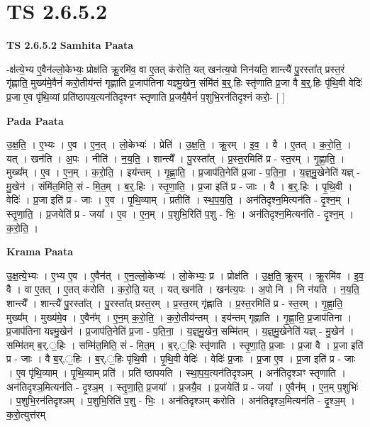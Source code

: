 \documentclass[17pt]{extarticle}
\begin{document}
\section*{ TS 2.6.5.2 }

\textbf{TS 2.6.5.2 } \newline
\textbf{Samhita Paata} \newline

-क्ष॑त्ये॒भ्य ए॒वैन॑ल्लो॒केभ्यः॒ प्रोक्ष॑ति क्रू॒रमि॑व॒ वा ए॒तत् क॑रोति॒ यत् खन॑त्य॒पो निन॑यति॒ शान्त्यै॑ पु॒रस्ता᳚त् प्रस्त॒रं गृ॑ह्णाति॒ मुख्य॑मे॒वैनं॑ करो॒तीय॑न्तं गृह्णाति प्र॒जाप॑तिना यज्ञ्मु॒खेन॒ संमि॑तं ब॒र्॒.हिः स्तृ॑णाति प्र॒जा वै ब॒र्॒.हिः पृ॑थि॒वी वेदिः॑ प्र॒जा ए॒व पृ॑थि॒व्यां प्रति॑ष्ठापय॒त्यन॑तिदृश्नꣳ स्तृणाति प्र॒जयै॒वैनं॑ प॒शुभि॒रन॑तिदृश्नं करो॒- [  ] \newline

\textbf{Pada Paata} \newline

उ॒क्ष॒ति॒ । ए॒भ्यः । ए॒व । ए॒न॒त् । लो॒केभ्यः॑ । प्रेति॑ । उ॒क्ष॒ति॒ । क्रू॒रम् । इ॒व॒ । वै । ए॒तत् । क॒रो॒ति॒ । यत् । खन॑ति । अ॒पः । नीति॑ । न॒य॒ति॒ । शान्त्यै᳚ । पु॒रस्ता᳚त् । प्र॒स्त॒रमिति॑ प्र - स्त॒रम् । गृ॒ह्णा॒ति॒ । मुख्य᳚म् । ए॒व । ए॒न॒म् । क॒रो॒ति॒ । इय॑न्तम् । गृ॒ह्णा॒ति॒ । प्र॒जाप॑ति॒नेति॑ प्र॒जा - प॒ति॒ना॒ । य॒ज्ञ्॒मु॒खेनेति॑ यज्ञ् - मु॒खेन॑ । संमि॑त॒मिति॒ सं - मि॒त॒म् । ब॒र्॒.हिः । स्तृ॒णा॒ति॒ । प्र॒जा इति॑ प्र - जाः । वै । ब॒र्॒.हिः । पृ॒थि॒वी । वेदिः॑ । प्र॒जा इति॑ प्र - जाः । ए॒व । पृ॒थि॒व्याम् । प्रतीति॑ । स्थ॒प॒य॒ति॒ । अन॑तिदृश्न॒मित्यन॑ति - दृ॒श्न॒म् । स्तृ॒णा॒ति॒ । प्र॒जयेति॑ प्र - जया᳚ । ए॒व । ए॒न॒म् । प॒शुभि॒रिति॑ प॒शु - भिः॒ । अन॑तिदृश्न॒मित्यन॑ति - दृ॒श्न॒म् । क॒रो॒ति॒ ।  \newline


\textbf{Krama Paata} \newline

उ॒क्ष॒त्ये॒भ्यः । ए॒भ्य ए॒व । ए॒वैन॑त् । ए॒न॒ल्लो॒केभ्यः॑ । लो॒केभ्यः॒ प्र । प्रोक्ष॑ति । उ॒क्ष॒ति॒ क्रू॒रम् । क्रू॒रमि॑व । इ॒व॒ वै । वा ए॒तत् । ए॒तत् क॑रोति । क॒रो॒ति॒ यत् । यत् खन॑ति । खन॑त्य॒पः । अ॒पो नि । नि न॑यति । न॒य॒ति॒ शान्त्यै᳚ । शान्त्यै॑ पु॒रस्ता᳚त् । पु॒रस्ता᳚त् प्रस्त॒रम् । प्र॒स्त॒रम् गृ॑ह्णाति । प्र॒स्त॒रमिति॑ प्र - स्त॒रम् । गृ॒ह्णा॒ति॒ मुख्य᳚म् । मुख्य॑मे॒व । ए॒वैन᳚म् । ए॒न॒म् क॒रो॒ति॒ । क॒रो॒तीय॑न्तम् । इय॑न्तम् गृह्णाति । गृ॒ह्णा॒ति॒ प्र॒जाप॑तिना । प्र॒जाप॑तिना यज्ञ्मु॒खेन॑ । प्र॒जाप॑ति॒नेति॑ प्र॒जा - प॒ति॒ना॒ । य॒ज्ञ्॒मु॒खेन॒ सम्मि॑तम् । य॒ज्ञ्॒मु॒खेनेति॑ यज्ञ् - मु॒खेन॑ । सम्मि॑तम् ब॒र्.॒हिः । सम्मि॑त॒मिति॒ सं - मि॒त॒म् । ब॒र्.॒हिः स्तृ॑णाति । स्तृ॒णा॒ति॒ प्र॒जाः । प्र॒जा वै । प्र॒जा इति॑ प्र - जाः । वै ब॒र्.॒हिः । ब॒र्.॒हिः पृ॑थि॒वी । पृ॒थि॒वी वेदिः॑ । वेदिः॑ प्र॒जाः । प्र॒जा ए॒व । प्र॒जा इति॑ प्र - जाः । ए॒व पृ॑थि॒व्याम् । पृ॒थि॒व्याम् प्रति॑ । प्रति॑ ष्ठापयति । स्था॒प॒य॒त्यन॑तिदृश्ञम् । अन॑तिदृश्ञꣳ स्तृणाति । अन॑तिदृश्ञ॒मित्यन॑ति - दृ॒श्ञ॒म् । स्तृ॒णा॒ति॒ प्र॒जया᳚ । प्र॒जयै॒व । प्र॒जयेति॑ प्र - जया᳚ । ए॒वैन᳚म् । ए॒न॒म् प॒शुभिः॑ । प॒शुभि॒रन॑तिदृश्ञम् । प॒शुभि॒रिति॑ प॒शु - भिः॒ । अन॑तिदृश्ञम् करोति । अन॑तिदृश्ञ॒मित्यन॑ति - दृ॒श्ञ॒म् । क॒रो॒त्युत्त॑रम् \newline
\end{document}
